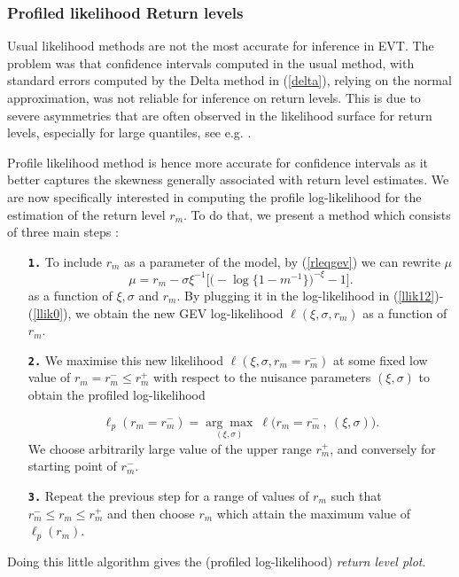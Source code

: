 \subsubsection*{Profiled likelihood Return levels}

Usual likelihood methods are not the most accurate for inference in EVT. The problem was that confidence intervals computed in the usual method, with standard 
errors computed by the Delta method in (\ref{delta}), relying on the normal approximation, was not reliable for inference on return levels.
 This is due to severe asymmetries that are often observed in the likelihood surface for return levels, especially for large quantiles, see e.g. \cite{bolivar_profile_2010}.

Profile likelihood method is hence more accurate for confidence intervals as it better captures the skewness generally associated with return level estimates.
 We are now specifically interested in computing the profile log-likelihood for the estimation of the return level $r_m$. To do that, we present a method which consists of three main steps :

\begin{enumerate}[label=\textbf{\arabic*})]
	
	\item[\textbf{\texttt{1.}}]  To include $r_m$ as a parameter of the model, by (\ref{rleqgev}) we can rewrite $\mu$ 
	\begin{equation*}
	\mu= r_m-\sigma\xi^{-1}\Big[\Big(-\log\{1-m^{-1}\}\Big)^{-\xi}-1\Big].
	\end{equation*}
	as a function of $\xi,\sigma$ and $r_m$.	By plugging it in the log-likelihood in (\ref{llik12})-(\ref{llik0}), we obtain the new GEV log-likelihood $\ell(\xi,\sigma,r_m)$ as a function of $r_m$.
	
	\item[\textbf{\texttt{2.}}]   We maximise this new likelihood $\ell (\xi,\sigma,r_m=r^{-}_{m})$ at some fixed low value of $r_m=r^{-}_{m}\leq r^{+}_{m}$ with respect to the nuisance parameters $(\xi,\sigma)$ to obtain the profiled log-likelihood
	
	\begin{equation*}
	\ell_p(r_m=r^{-}_{m})=\underset{(\xi,\sigma)}{\mathrm{\arg\max}}\ \ell \Big(r_m=r^{-}_{m}\ ,\ (\xi,\sigma)\Big).
	\end{equation*} 
	We choose arbitrarily large value of the upper range $r^{+}_m$, and conversely for starting point of $r^{-}_m$.
	
	\item[\textbf{\texttt{3.}}]  Repeat the previous step for a range of values of $r_m$ such that $r^{-}_{m}\leq r_m\leq r^{+}_{m}$ and then choose $r_m$ which attain the maximum value of $\ell_p(r_m)$.
\end{enumerate}
Doing this little algorithm gives the (profiled log-likelihood) \emph{return level plot}. 

